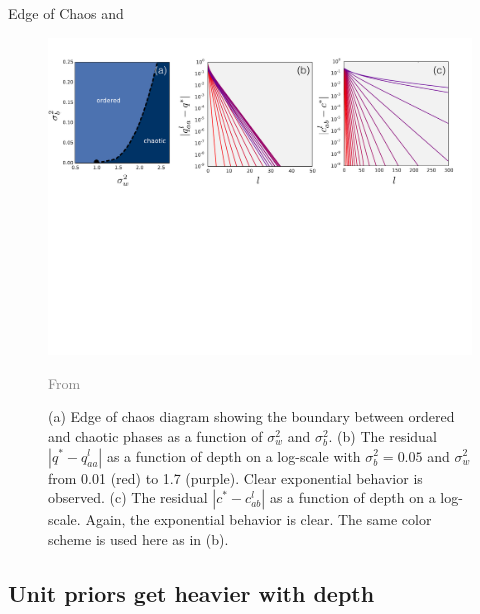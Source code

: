 \documentclass[9pt,handout]{beamer}
\begin{document}
\begin{frame}[allowframebreaks]{Edge of Chaos}
\citet{poole2016exponential} and  \citet{schoenholz2016deep} \begin{figure}[h]
\begin{center}
\includegraphics[width=\linewidth]{figures_julyan/bdl/figure_1}
\caption{(a) Edge of chaos diagram showing the boundary between ordered and chaotic phases as a function of $\sigma_w^2$ and $\sigma_b^2$. (b) The residual $|q^* - q_{aa}^l|$ as a function of depth on a log-scale with $\sigma_b^2 = 0.05$ and $\sigma_w^2$ from 0.01 (red) to 1.7 (purple). Clear exponential behavior is observed. (c) The residual $|c^* - c_{ab}^l|$ as a function of depth on a log-scale. Again, the exponential behavior is clear. The same color scheme is used here as in (b).  \label{fig:phase_diagram}}
\end{center}
\hfill\textcolor{gray}{From \citet{schoenholz2016deep}}
\end{figure}


\end{frame}


\subsection{Unit priors get heavier with depth}
\end{document}
